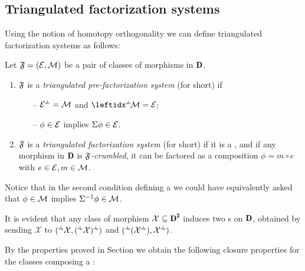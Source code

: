 \subsection{Triangulated factorization systems}
Using the notion of homotopy orthogonality we can define triangulated factorization systems as follows:
\begin{definition}\label{the_def_of_hfs}
Let $\mathfrak{F}=(\mathcal{E},\mathcal{M})$ be a pair of classes of morphisms in $\cD$. 
\begin{enumerate}
\item $\mathfrak{F}$ is a \emph{triangulated pre-factorization system} (\phfs for short) if 
\begin{enumerate}
\item[\rm --] $\E^{ \horth }=\M$ and $\lhorth{\!\M}=\E$;
\item[\rm --] $\phi\in \mathcal{E}$ implies $\Sigma\phi\in \mathcal{E}$.
\end{enumerate} 
\item $\mathfrak{F}$ is a \emph{triangulated factorization system} (\hfs for short) if it is a \phfs, and if any morphism in $\cD$ is \emph{$\mathfrak{F}$-crumbled}, \ie it can be factored as a composition $\phi=m\circ e$ with $e\in\mathcal{E}, m\in\mathcal{M}$.
\end{enumerate}
\end{definition}
Notice that in the second condition defining a \phfs we could have equivalently asked that $\phi\in\mathcal{M}$ implies $\Sigma^{-1}\phi\in\mathcal{M}$.
\begin{remark}
It is evident %
that any class of morphism $\mathcal{X}\subseteq \cD^\due$ induces two {\phfs}s on $\cD$, obtained by sending $\mathcal{X}$ to $({}^{\horth} \mathcal{X}, ({}^{\horth}\mathcal{X})^{\horth})$ and $({}^{\horth}(\mathcal{X}^{\horth}),\mathcal{X}^{\horth})$. %
\end{remark}

By the properties proved in Section  we obtain the following closure properties for the classes composing a \phfs:

